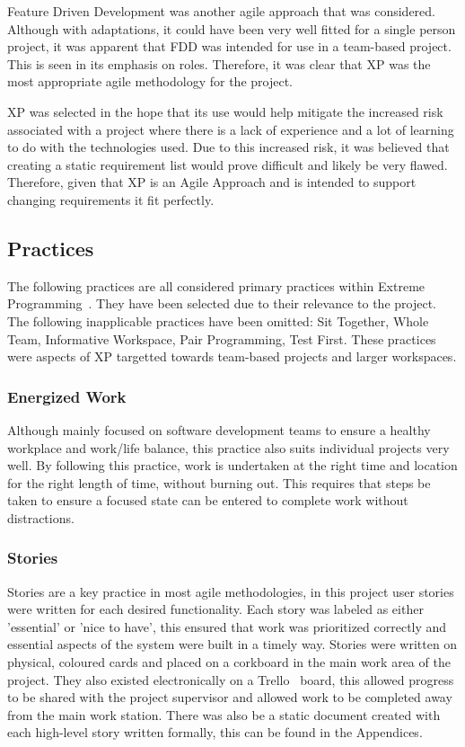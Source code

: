 Feature Driven Development was another agile approach that was considered. Although with adaptations, it could have been very well fitted for a single person project, it was apparent that FDD was intended for use in a team-based project. This is seen in its emphasis on roles. Therefore, it was clear that XP was the most appropriate agile methodology for the project.

XP was selected in the hope that its use would help mitigate the increased risk associated with a project where there is a lack of experience and a lot of learning to do with the technologies used. Due to this increased risk, it was believed that creating a static requirement list would prove difficult and likely be very flawed. Therefore, given that XP is an Agile Approach and is intended to support changing requirements it fit perfectly.

\subsection{Practices}
The following practices are all considered primary practices within Extreme Programming~\cite[Ch.~7]{xp_explained_ref}. They have been selected due to their relevance to the project. The following inapplicable practices have been omitted: Sit Together, Whole Team, Informative Workspace, Pair Programming, Test First. These practices were aspects of XP targetted towards team-based projects and larger workspaces.

\subsubsection{Energized Work}
Although mainly focused on software development teams to ensure a healthy workplace and work/life balance, this practice also suits individual projects very well. By following this practice, work is undertaken at the right time and location for the right length of time, without burning out. This requires that steps be taken to ensure a focused state can be entered to complete work without distractions. 

\subsubsection{Stories}
Stories are a key practice in most agile methodologies, in this project user stories were written for each desired functionality. Each story was labeled as either 'essential' or 'nice to have', this ensured that work was prioritized correctly and essential aspects of the system were built in a timely way. Stories were written on physical, coloured cards and placed on a corkboard in the main work area of the project. They also existed electronically on a Trello~\cite{trello_ref} board, this allowed progress to be shared with the project supervisor and allowed work to be completed away from the main work station. There was also be a static document created with each high-level story written formally, this can be found in the Appendices.

